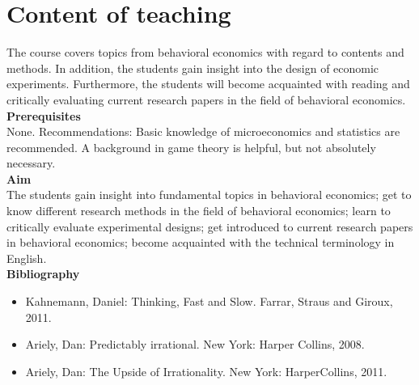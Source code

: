 


\chapter*{Content of teaching}

The course covers topics from behavioral economics with regard to contents and methods. In addition, the students gain insight into the design of economic experiments. Furthermore, the students will become acquainted with reading and critically evaluating current research papers in the field of behavioral economics. \\
  
\textbf{Prerequisites} \\
None. Recommendations: Basic knowledge of microeconomics and statistics are recommended. A background in game theory is helpful, but not absolutely necessary. \\

\textbf{Aim} \\
The students gain insight into fundamental topics in behavioral economics;
get to know different research methods in the field of behavioral economics;
learn to critically evaluate experimental designs;
get introduced to current research papers in behavioral economics;
become acquainted with the technical terminology in English. \\

\textbf{Bibliography} \\
\begin{itemize}
	\item Kahnemann, Daniel: Thinking, Fast and Slow. Farrar, Straus and Giroux, 2011.
	\item Ariely, Dan: Predictably irrational. New York: Harper Collins, 2008.
	\item Ariely, Dan: The Upside of Irrationality. New York: HarperCollins, 2011. 
\end{itemize}	
